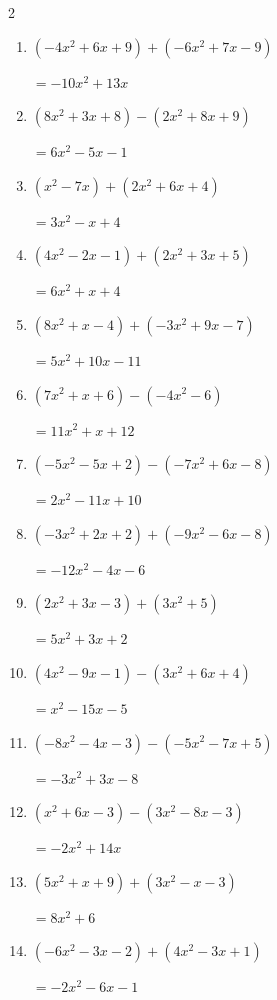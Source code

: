 \begin{multicols}{2}
\begin{enumerate}
  \item $(-4x^{2}+6x+9)+(-6x^{2}+7x-9)$

        $=-10x^{2}+13x$

  \item $(8x^{2}+3x+8)-(2x^{2}+8x+9)$

        $=6x^{2}-5x-1$

  \item $(x^{2}-7x)+(2x^{2}+6x+4)$

        $=3x^{2}-x+4$

  \item $(4x^{2}-2x-1)+(2x^{2}+3x+5)$

        $=6x^{2}+x+4$

  \item $(8x^{2}+x-4)+(-3x^{2}+9x-7)$

        $=5x^{2}+10x-11$

  \item $(7x^{2}+x+6)-(-4x^{2}-6)$

        $=11x^{2}+x+12$

  \item $(-5x^{2}-5x+2)-(-7x^{2}+6x-8)$

        $=2x^{2}-11x+10$

  \item $(-3x^{2}+2x+2)+(-9x^{2}-6x-8)$

        $=-12x^{2}-4x-6$

  \item $(2x^{2}+3x-3)+(3x^{2}+5)$

        $=5x^{2}+3x+2$

  \item $(4x^{2}-9x-1)-(3x^{2}+6x+4)$

        $=x^{2}-15x-5$

  \item $(-8x^{2}-4x-3)-(-5x^{2}-7x+5)$

        $=-3x^{2}+3x-8$

  \item $(x^{2}+6x-3)-(3x^{2}-8x-3)$

        $=-2x^{2}+14x$

  \item $(5x^{2}+x+9)+(3x^{2}-x-3)$

        $=8x^{2}+6$

  \item $(-6x^{2}-3x-2)+(4x^{2}-3x+1)$

        $=-2x^{2}-6x-1$

\columnbreak %


\end{enumerate}
\end{multicols}
